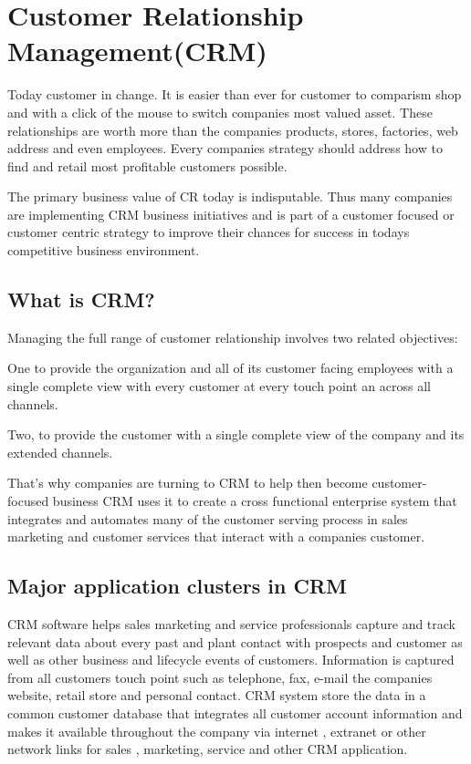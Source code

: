 \documentclass[twocolumn, 12pt, a4paper]{article}
\begin{document}
\section{Customer Relationship Management(CRM)}
Today customer in change. It is easier than ever for customer to comparism shop and with a click of the mouse to switch companies most valued asset. These relationships are worth more than the companies products, stores, factories, web address and even employees. Every companies strategy should address how to find and retail most profitable customers possible.

The primary business value of CR today is indisputable. Thus many companies are implementing CRM business initiatives and is part of a customer focused or customer centric strategy to improve their chances for success in todays competitive business environment.

\subsection{What is CRM?}
Managing the full range of customer relationship involves two related objectives:

One to provide the organization and all of its customer facing employees with a single complete view with every customer at every touch point an across all channels.
	
Two, to provide the customer with a single complete view of the company and its extended channels.

That’s why companies are turning to CRM to help then become customer-focused business CRM uses it to create a cross functional enterprise system that integrates and automates many of the customer serving process  in sales marketing and customer services that interact with a companies customer.

\subsection{Major application clusters in CRM}
CRM software helps sales marketing and service professionals capture and track relevant data about every past and plant contact with prospects and customer as well as other business and lifecycle events of customers. Information is captured from all customers touch point such as telephone, fax, e-mail the companies website, retail store and personal contact. CRM system store the data in a common  customer database that integrates all customer account information and makes it available throughout the company via internet , extranet or other network links for sales , marketing, service and other CRM application.
\end{document}
